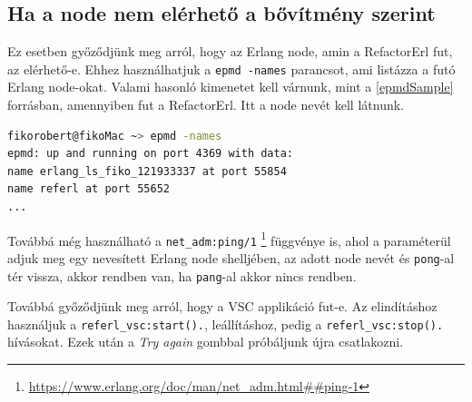 \subsection{Ha a node nem elérhető a bővítmény szerint} \label{not_reachable_node}

Ez esetben győződjünk meg arról, hogy az Erlang node, amin a RefactorErl fut, az elérhető-e. Ehhez használhatjuk a \lstinline{epmd -names} parancsot, ami listázza a futó Erlang node-okat.
Valami hasonló kimenetet kell várnunk, mint a \ref{epmdSample} forrásban, amennyiben fut a RefactorErl. Itt a node nevét kell látnunk.

\lstset{caption=Erlang Port Mapper Deamon (epmd) példa kimenete, label=epmdSample}
\begin{lstlisting}[language={sh}] 
fikorobert@fikoMac ~> epmd -names
epmd: up and running on port 4369 with data:
name erlang_ls_fiko_121933337 at port 55854
name referl at port 55652
...
\end{lstlisting}


Továbbá még használható a \lstinline{net_adm:ping/1} \footnote{\url{https://www.erlang.org/doc/man/net_adm.html##ping-1}} függvénye is, ahol a paraméterül adjuk meg egy nevesített Erlang node shelljében, az adott node nevét és \lstinline{pong}-al tér vissza, akkor rendben van, ha \lstinline{pang}-al akkor nincs rendben.

Továbbá győződjünk meg arról, hogy a VSC applikáció fut-e. Az elindításhoz használjuk a \lstinline{referl_vsc:start().}, leállításhoz, pedig a \lstinline{referl_vsc:stop().} hívásokat. Ezek után a \textit{Try again} gombbal próbáljunk újra csatlakozni.
